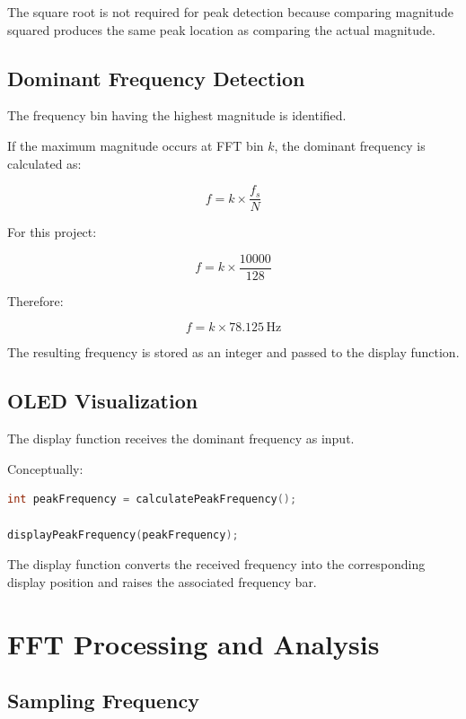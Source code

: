 \documentclass{article}
\begin{document}
\begin{center}
The square root is not required for peak detection because comparing magnitude squared produces the same peak location as comparing the actual magnitude.

\subsection{Dominant Frequency Detection}

The frequency bin having the highest magnitude is identified.

If the maximum magnitude occurs at FFT bin $k$, the dominant frequency is calculated as:

\[
f =
k \times
\frac{f_s}{N}
\]

For this project:

\[
f =
k \times
\frac{10000}{128}
\]

Therefore:

\[
f =
k \times
78.125\,\text{Hz}
\]

The resulting frequency is stored as an integer and passed to the display function.

\subsection{OLED Visualization}

The display function receives the dominant frequency as input.

Conceptually:

\begin{lstlisting}[language=C++]
int peakFrequency = calculatePeakFrequency();

displayPeakFrequency(peakFrequency);
\end{lstlisting}

The display function converts the received frequency into the corresponding display position and raises the associated frequency bar.

\newpage


\section{FFT Processing and Analysis}

\subsection{Sampling Frequency}


\end{center}
\end{document}
